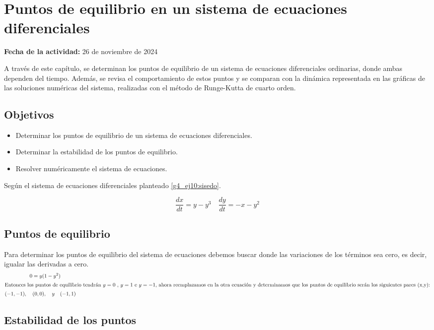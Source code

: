 \documentclass[../portafolio.tex]{subfiles}
\begin{document}
\chapter{Puntos de equilibrio en un sistema de ecuaciones diferenciales }
\label{g4_ej10}
\hfill \textbf{Fecha de la actividad:} 26 de noviembre de 2024

\medskip

A través de este capítulo, se determinan los puntos de equilibrio de un sistema de ecuaciones diferenciales ordinarias, donde ambas dependen del tiempo. Además, se revisa el comportamiento de estos puntos y se comparan con la dinámica representada en las gráficas de las soluciones numéricas del sistema, realizadas con el método de Runge-Kutta de cuarto orden.

\section*{Objetivos}
\begin{itemize}
\item Determinar los puntos de equilibrio de un sistema de ecuaciones diferenciales.
\item Determinar la estabilidad de los puntos de equilibrio.
\item Resolver numéricamente el sistema de ecuaciones.
\end{itemize}
Según el sistema de ecuaciones diferenciales planteado \eqref{g4_ej10:sisedo}.

\begin{equation}\label{g4_ej10:sisedo}
\frac{dx}{dt}=y-y^3 \quad \frac{dy}{dt}=-x-y^2
\end{equation}
\section{Puntos de equilibrio}
Para determinar los puntos de equilibrio del sistema de ecuaciones debemos buscar donde las variaciones de los términos sea cero, es decir, igualar las derivadas a cero.
\begin{align}
0=y(&1-y^2)\label{g4_ej10:pts0}\\ \intertext{Entonces los puntos de equilibrio tendrán $y=0$ , $y=1$ e $y=-1$, ahora reemplazamos en la otra ecuación y determinamos que los puntos de equilibrio serán los siguientes pares (x,y):}
(-1,-1),\quad (0,0)&, \quad y \quad (-1,1)
\end{align}

\section{Estabilidad de los puntos}
\end{document}

